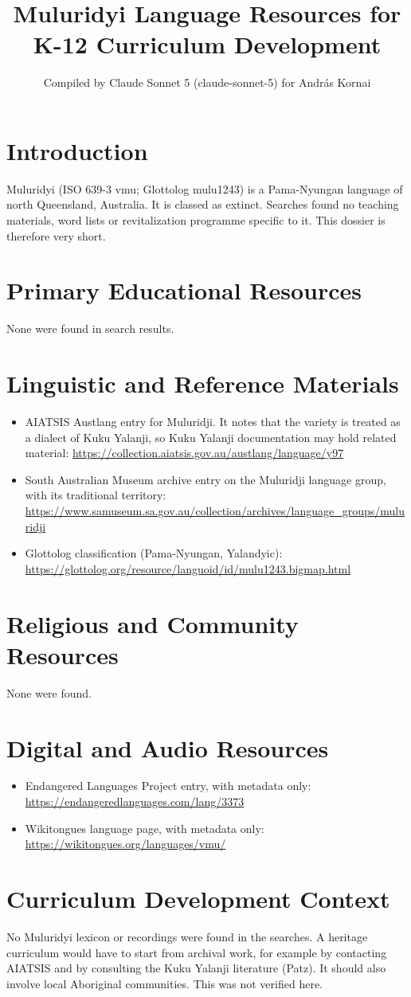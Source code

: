 \documentclass[12pt]{article}
\title{Muluridyi Language Resources for K-12 Curriculum Development}
\author{Compiled by Claude Sonnet 5 (claude-sonnet-5) for Andr\'as Kornai}
\date{}
\begin{document}
\maketitle

\section{Introduction}
Muluridyi (ISO 639-3 vmu; Glottolog mulu1243) is a Pama-Nyungan language of north Queensland, Australia. It is classed as extinct. Searches found no teaching materials, word lists or revitalization programme specific to it. This dossier is therefore very short.

\section{Primary Educational Resources}
None were found in search results.

\section{Linguistic and Reference Materials}
\begin{itemize}
\item AIATSIS Austlang entry for Muluridji. It notes that the variety is treated as a dialect of Kuku Yalanji, so Kuku Yalanji documentation may hold related material: \url{https://collection.aiatsis.gov.au/austlang/language/y97}
\item South Australian Museum archive entry on the Muluridji language group, with its traditional territory: \url{https://www.samuseum.sa.gov.au/collection/archives/language_groups/muluridji}
\item Glottolog classification (Pama-Nyungan, Yalandyic): \url{https://glottolog.org/resource/languoid/id/mulu1243.bigmap.html}
\end{itemize}

\section{Religious and Community Resources}
None were found.

\section{Digital and Audio Resources}
\begin{itemize}
\item Endangered Languages Project entry, with metadata only: \url{https://endangeredlanguages.com/lang/3373}
\item Wikitongues language page, with metadata only: \url{https://wikitongues.org/languages/vmu/}
\end{itemize}

\section{Curriculum Development Context}
No Muluridyi lexicon or recordings were found in the searches. A heritage curriculum would have to start from archival work, for example by contacting AIATSIS and by consulting the Kuku Yalanji literature (Patz). It should also involve local Aboriginal communities. This was not verified here.
\end{document}
